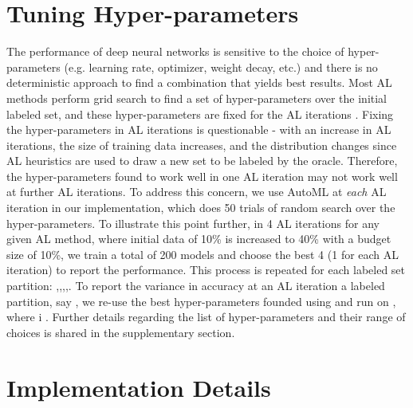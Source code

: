 \documentclass[10pt,twocolumn,letterpaper]{article}
\begin{document}
\section{Tuning Hyper-parameters}

The performance of deep neural networks is sensitive to the choice of hyper-parameters (e.g. learning rate, optimizer, weight decay, etc.) and there is no deterministic approach to find a combination that yields best results. Most AL methods perform grid search to find a set of hyper-parameters over the initial labeled set, and these hyper-parameters are fixed for the AL iterations \cite{coreset_sener2018active,VAAL_sinha2019variational}.
Fixing the hyper-parameters in AL iterations is questionable - with an increase in AL iterations, the size of training data increases, and the distribution changes since AL heuristics are used to draw a new set to be labeled by the oracle. Therefore, the hyper-parameters found to work well in one AL iteration may not work well at further AL iterations. To address this concern, we use AutoML at \textit{each} AL iteration in our implementation, which does 50 trials of random search over the hyper-parameters. To illustrate this point further, in 4 AL iterations for any given AL method, where initial data of 10\% is increased to 40\% with a budget size of 10\%, we train a total of 200 models and choose the best 4 (1 for each AL iteration) to report the performance. This process is repeated for each labeled set 
partition: ,,,,. To report the variance in accuracy at an AL iteration a labeled partition, say ,  we re-use the best hyper-parameters founded using  and run on , where i . Further details regarding the list of hyper-parameters and their range of choices is shared in the supplementary section.










\section{Implementation Details}
\end{document}
